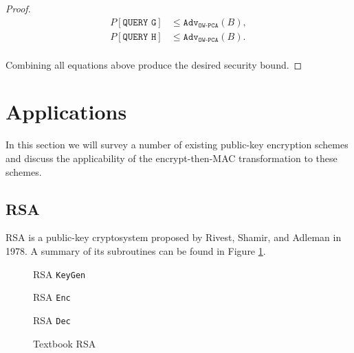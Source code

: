 \documentclass[runningheads]{llncs}
\newcommand{\adv}{\texttt{Adv}}
\begin{document}
\begin{proof}
    \begin{equation*}
        \begin{aligned}
            P\left[\texttt{QUERY G}\right] &\leq \adv_\texttt{OW-PCA}(B), \\
            P\left[\texttt{QUERY H}\right] &\leq \adv_\texttt{OW-PCA}(B). \\
        \end{aligned}
    \end{equation*}

    Combining all equations above produce the desired security bound.
\end{proof}

\section{Applications}\label{sec:applications}
In this section we will survey a number of existing public-key encryption schemes and discuss the applicability of the encrypt-then-MAC transformation to these schemes.

\subsection{RSA}
RSA \cite{DBLP:journals/cacm/RivestSA78} is a public-key cryptosystem proposed by Rivest, Shamir, and Adleman in 1978. A summary of its subroutines can be found in Figure \ref{fig:textbook-rsa}. 

\begin{figure}[h]
    \centering

    \begin{minipage}[t]{0.33\textwidth}
        \begin{algorithm}[H]
            \caption*{RSA \texttt{KeyGen}}
        \end{algorithm}
    \end{minipage}
    \begin{minipage}[t]{0.32\textwidth}
        \begin{algorithm}[H]
            \caption*{RSA \texttt{Enc}}
        \end{algorithm}
    \end{minipage}
    \begin{minipage}[t]{0.32\textwidth}
        \begin{algorithm}[H]
            \caption*{RSA \texttt{Dec}}
        \end{algorithm}
    \end{minipage}
    \caption{Textbook RSA}\label{fig:textbook-rsa}
\end{figure}
\end{document}
